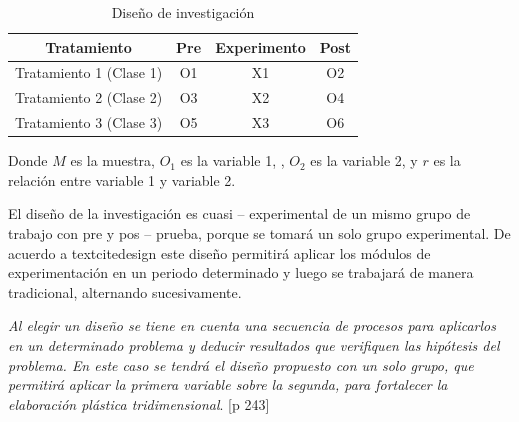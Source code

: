 \documentclass[12pt,a4paper]{article}
\begin{document}
\begin{table}[ht!]
	\caption{Diseño de investigación}
	\label{figg}
	
	\begin{tabular}{cccc}
		\toprule
		Tratamiento             & Pre & Experimento & Post \\
		\midrule
		Tratamiento 1 (Clase 1) & O1  & X1          & O2    \\
		Tratamiento 2 (Clase 2) & O3  & X2          & O4     \\
		Tratamiento 3 (Clase 3) & O5  & X3          & O6    \\
		\bottomrule
	\end{tabular}
\end{table}


Donde $M$ es la muestra, $O_1$ es la variable 1, \MakeTextLowercase{\variablei},
$O_2$ es la variable 2, \MakeTextLowercase{\variabled} y
$r$ es la relación entre variable 1 y variable 2.

El diseño de la investigación es cuasi -- experimental de un mismo grupo de trabajo con pre y pos -- prueba, porque se tomará un solo grupo experimental. De acuerdo a textcite{design} este diseño permitirá aplicar los módulos de experimentación en un periodo determinado y luego se trabajará de manera tradicional, alternando sucesivamente.

\begin{displayquote}
	\emph{Al elegir un diseño se tiene en cuenta una secuencia de procesos para aplicarlos en un determinado problema y deducir resultados que verifiquen las hipótesis del problema. En este caso se tendrá el diseño propuesto con un solo grupo, que permitirá aplicar la primera variable sobre la segunda, para fortalecer la elaboración plástica tridimensional}. \cite{kothari_research_2004}[p 243]
\end{displayquote}
\end{document}
